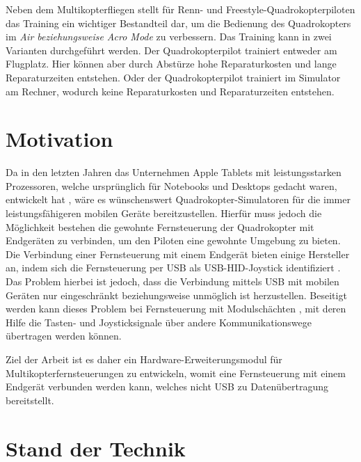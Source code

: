 Neben dem Multikopterfliegen stellt für Renn- und Freestyle-Quadrokopterpiloten das Training ein wichtiger Bestandteil dar, um die Bedienung des Quadrokopters im \textit{Air beziehungsweise Acro Mode} zu verbessern. Das Training kann in zwei Varianten durchgeführt werden. Der Quadrokopterpilot trainiert entweder am Flugplatz. Hier können aber durch Abstürze hohe Reparaturkosten und lange Reparaturzeiten entstehen. Oder der Quadrokopterpilot trainiert im Simulator am Rechner, wodurch keine Reparaturkosten und Reparaturzeiten entstehen.

\section{Motivation}

Da in den letzten Jahren das Unternehmen Apple Tablets mit leistungsstarken Prozessoren, welche ursprünglich für Notebooks und Desktops gedacht waren, entwickelt hat \cite{appleM2IPad}, wäre es wünschenswert Quadrokopter-Simulatoren für die immer leistungsfähigeren mobilen Geräte bereitzustellen. Hierfür muss jedoch die Möglichkeit bestehen die gewohnte Fernsteuerung der Quadrokopter mit Endgeräten zu verbinden, um den Piloten eine gewohnte Umgebung zu bieten. Die Verbindung einer Fernsteuerung mit einem Endgerät bieten einige Hersteller an, indem sich die Fernsteuerung per USB als USB-\acs{HID}-Joystick identifiziert \cite{opentxJoystick}. Das Problem hierbei ist jedoch, dass die Verbindung mittels USB mit mobilen Geräten nur eingeschränkt beziehungsweise unmöglich ist herzustellen. Beseitigt werden kann dieses Problem bei Fernsteuerung mit Modulschächten \cite{opentxModulbay}, mit deren Hilfe  die Tasten- und Joysticksignale über andere Kommunikationswege übertragen werden können.

Ziel der Arbeit ist es daher ein Hardware-Erweiterungsmodul für Multikopterfernsteuerungen zu entwickeln, womit eine Fernsteuerung mit einem Endgerät verbunden werden kann, welches nicht USB zu Datenübertragung bereitstellt.

\section{Stand der Technik}

